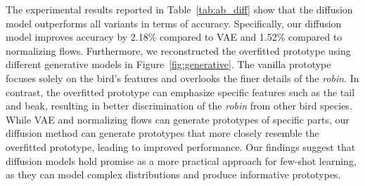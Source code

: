The experimental results reported in Table~\ref{tab:ab_diff} show that the diffusion model outperforms all variants in terms of accuracy. Specifically, our diffusion model improves accuracy by 2.18\% compared to VAE and 1.52\% compared to normalizing flows.
Furthermore, we reconstructed the overfitted prototype using different generative models in Figure~\ref{fig:generative}. The vanilla prototype focuses solely on the bird's features and 
overlooks the finer details of the \textit{robin}. In contrast, the overfitted prototype can emphasize specific 
features such as the tail and beak, resulting in better discrimination of the \textit{robin} from other bird species. While VAE and normalizing flows can generate prototypes of specific parts, our diffusion method can generate prototypes that more closely resemble the overfitted prototype, leading to improved performance.
Our findings suggest that diffusion models hold promise as a more practical approach for few-shot learning, as they can model complex distributions and produce informative prototypes.


